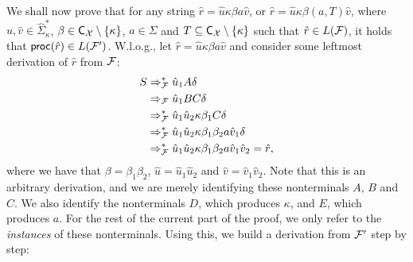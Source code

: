 We shall now prove that for any string $\hat{r} = \hat{u}\kappa \beta a\hat{v}$, or $\hat{r} = \hat{u}\kappa \beta (a,T)\hat{v}$, where $\hat{u}, \hat{v}\in\hat{\Sigma}_\kappa^*$, $\beta\in\textsf{C}_{\mathcal{X}}\setminus\{\kappa\}$, $a\in\Sigma$ and $T\subseteq\textsf{C}_{\mathcal{X}}\setminus\{\kappa\}$ such that $\hat{r}\in L(\mathcal{F})$, it holds that $\mathsf{proc}(\hat{r})\in L(\mathcal{F}')$. 
W.l.o.g., let $\hat{r} =  \hat{u}\kappa \beta a\hat{v}$ and consider
some leftmost derivation of $\hat{r}$ from $\mathcal{F}$:
\begin{align*}
	S  &\Rightarrow_{\mathcal{F}}^* 
	\hat{u}_1 A \delta \\
	&\Rightarrow_{\mathcal{F}} 
	\hat{u}_1 B C \delta \\
	&\Rightarrow_{\mathcal{F}}^* 
	\hat{u}_1 \hat{u}_2 \kappa \beta_1 C \delta \\
	&\Rightarrow_{\mathcal{F}}^*
	\hat{u}_1 \hat{u}_2 \kappa \beta_1 \beta_2 a \hat{v}_1 \delta \\
	&\Rightarrow_{\mathcal{F}}^* 
	\hat{u}_1 \hat{u}_2 \kappa \beta_1 \beta_2 a \hat{v}_1 \hat{v}_2 = \hat{r},
\end{align*}
where we have that $\beta = \beta_1\beta_2$, $\hat{u} = \hat{u}_1\hat{u}_2$ and $\hat{v} = \hat{v}_1\hat{v}_2$. Note that this is an arbitrary derivation, and we are merely identifying these nonterminals $A$, $B$ and $C$. We also identify the nonterminals $D$, which produces $\kappa$, and $E$, which produces $a$. For the rest of the current part of the proof, we only refer to the \emph{instances} of these nonterminals. Using this, we build a derivation from $\mathcal{F}'$ step by step:
